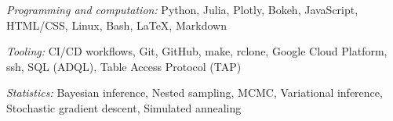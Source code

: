 \textit{Programming and computation:} Python, Julia, Plotly, Bokeh, JavaScript, HTML/CSS, Linux, Bash, \LaTeX, Markdown

\textit{Tooling:} CI/CD workflows, Git, GitHub, make, rclone, Google Cloud Platform, ssh, SQL (ADQL), Table Access Protocol (TAP)

\textit{Statistics:} Bayesian inference, Nested sampling, MCMC, Variational inference, Stochastic gradient descent, Simulated annealing